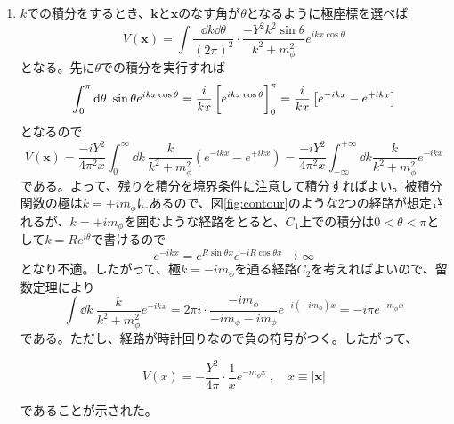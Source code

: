 \documentclass[unicode,a4paper,10pt]{ltjsarticle}
\begin{document}
\begin{enumerate}
  \item
        $k$での積分をするとき、$\bm{k}$と$\bm{x}$のなす角が$\theta$となるように極座標を選べば
        \begin{equation}
          V(\bm{x})
          =
          \int\dfrac{\dd k\dd \theta}{(2\pi)^2}
          \cdot
          \dfrac{-Y^2k^2\sin\theta}{k^2+m_{\phi}^2}
          e^{ikx\cos\theta}
        \end{equation}
        となる。先に$\theta$での積分を実行すれば
        \begin{align}
          \int^{\pi}_{0}\dd\theta\ \sin\theta e^{ikx\cos\theta}
          =
          \frac{i}{kx}\left[ e^{ikx\cos\theta}\vphantom{\dfrac{1}{2}} \right]_{0}^{\pi}
          =
          \frac{i}{kx}\left[ e^{-ikx}-e^{+ikx} \right]
        \end{align}
        となるので
        \begin{equation}
          V(\bm{x})
          =          
          \frac{-iY^2}{4\pi^2x}
          \int_{0}^{\infty}\dd k\ \frac{k}{k^2+m_{\phi}^2}
          \left( e^{-ikx}-e^{+ikx} \right)
          =
          \frac{-iY^2}{4\pi^2 x}\int_{-\infty}^{+\infty}\dd k
          \frac{k}{k^2+m_{\phi}^2}e^{-ikx}
        \end{equation}
        である。よって、残りを積分を境界条件に注意して積分すればよい。被積分関数の極は$k=\pm im_{\phi}$にあるので、図\ref{fig:contour}のような2つの経路が想定されるが、$k=+im_{\phi}$を囲むような経路をとると、$C_{1}$上での積分は$0<\theta<\pi$として$k=Re^{i\theta}$で書けるので
        \begin{equation}
          e^{-ikx}
          =
          e^{R\sin\theta x}e^{-i R\cos\theta x}
          \longrightarrow
          \infty
        \end{equation}
        となり不適。したがって、極$k=-im_{\phi}$を通る経路$C_{2}$を考えればよいので、留数定理により
        \begin{equation}
          \int\dd k\ \frac{k}{k^2+m_{\phi}^2}e^{-ikx}
          =
          2\pi i
          \cdot
          \dfrac{-im_{\phi}}{-im_{\phi}-im_{\phi}}e^{-i(-im_{\phi})x}
          =
          -i\pi e^{-m_{\phi}x}          
        \end{equation}
        である。ただし、経路が時計回りなので負の符号がつく。したがって、
        \begin{graybox}
          \begin{equation}
            V(x)
            =
            -
            \frac{Y^2}{4\pi}
            \cdot
            \frac{1}{x}e^{-m_{\phi}x}
            \ ,\quad
            x\equiv|\bm{x}|
          \end{equation}          
        \end{graybox}
        であることが示された。


\end{enumerate}
\end{document}
